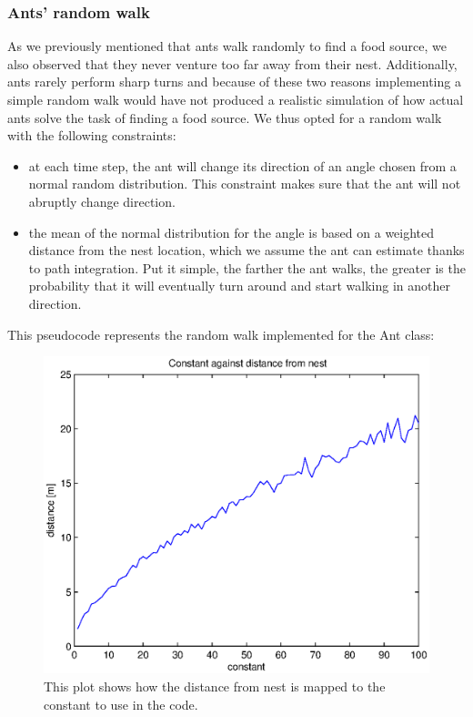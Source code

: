 \documentclass[11pt]{article}
\begin{document}
\subsubsection {Ants' random walk}
As we previously mentioned that ants walk randomly to find a food source, we also observed that they never venture too far away from their nest. Additionally, ants rarely perform sharp turns and because of these two reasons implementing a simple random walk would have not produced a realistic simulation of how actual ants solve the task of finding a food source. We thus opted for a random walk with the following constraints:

\begin{itemize}
\item at each time step, the ant will change its direction of an angle chosen from a normal random distribution. This constraint makes sure that the ant will not abruptly change direction.
\item the mean of the normal distribution for the angle is based on a weighted distance from the nest location, which we assume the ant can estimate thanks to path integration. Put it simple, the farther the ant walks, the greater is the probability that it will eventually turn around and start walking in another direction.
\end{itemize}

This pseudocode represents the random walk implemented for the Ant class:



\begin{figure}[h!]
	\includegraphics[width=.9\textwidth]{../sources/results/constantAgainstDistance.eps}
	\caption{This plot shows how the distance from nest is mapped to the constant to use in the code.}
\end{figure}
\end{document}
